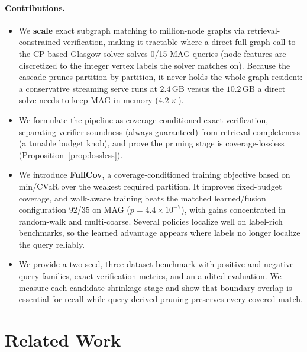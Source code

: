 \documentclass{article}
\begin{document}
\paragraph{Contributions.}
\begin{itemize}
    \item We \textbf{scale} exact subgraph matching to million-node graphs via retrieval-constrained verification, making it tractable where a direct full-graph call to the CP-based Glasgow solver solves 0/15 MAG queries (node features are discretized to the integer vertex labels the solver matches on). Because the cascade prunes partition-by-partition, it never holds the whole graph resident: a conservative streaming serve runs at $2.4$\,GB versus the $10.2$\,GB a direct solve needs to keep MAG in memory ($4.2\times$).
    \item We formulate the pipeline as coverage-conditioned exact verification, separating verifier soundness (always guaranteed) from retrieval completeness (a tunable budget knob), and prove the pruning stage is coverage-lossless (Proposition~\ref{prop:lossless}).
    \item We introduce \textbf{FullCov}, a coverage-conditioned training objective based on min/CVaR over the weakest required partition. It improves fixed-budget coverage, and walk-aware training beats the matched learned/fusion configuration $92$/$35$ on MAG ($p{=}4.4{\times}10^{-7}$), with gains concentrated in random-walk and multi-coarse. Several policies localize well on label-rich benchmarks, so the learned advantage appears where labels no longer localize the query reliably.
    \item We provide a two-seed, three-dataset benchmark with positive and negative query families, exact-verification metrics, and an audited evaluation. We measure each candidate-shrinkage stage and show that boundary overlap is essential for recall while query-derived pruning preserves every covered match.
\end{itemize}

\section{Related Work}
\end{document}
